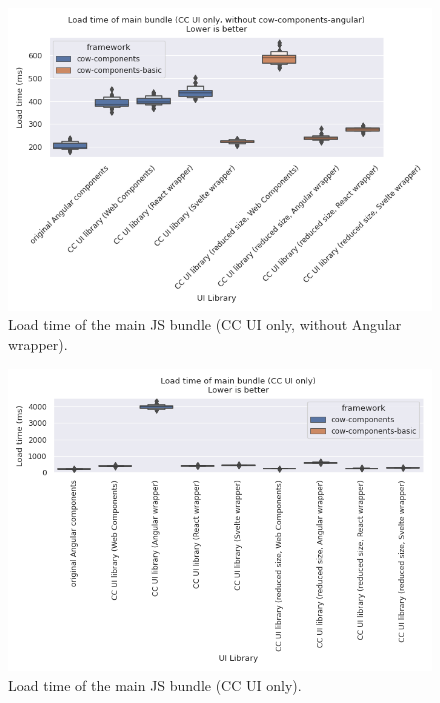 \begin{figure}[h]
	\includegraphics[width=\columnwidth]{plots/load-time-cow-no-angular.png}
	\caption{Load time of the main JS bundle (CC UI only, without Angular wrapper).}
	\label{fig:results:load-time-cow-no-angular}
	\centering
\end{figure}

\begin{figure}[h]
	\includegraphics[width=\columnwidth]{plots/load-time-cow.png}
	\caption{Load time of the main JS bundle (CC UI only).}
	\label{fig:results:load-time-cow}
	\centering
\end{figure}

